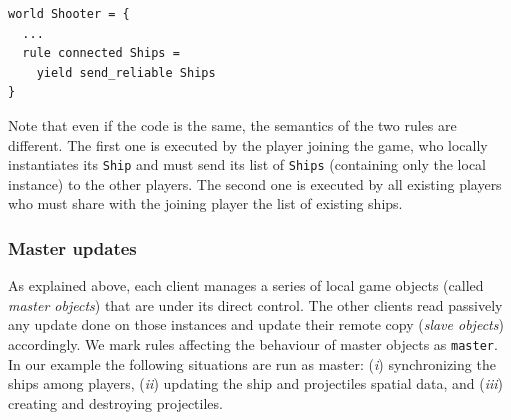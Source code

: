 \begin{lstlisting}
world Shooter = {
  ...
  rule connected Ships =
    yield send_reliable Ships
}
\end{lstlisting}

Note that even if the code is the same, the semantics of the two rules are different. The first one is executed by the player joining the game, who locally instantiates its \texttt{Ship} and must send its list of \texttt{Ships} (containing only the local instance) to the other players. The second one is executed by all existing players who must share with the joining player the list of existing ships.


\subsubsection{Master updates}
As explained above, each client manages a series of local game objects (called \textit{master objects}) that are under its direct control. The other clients read passively any update done on those instances and update their remote copy  (\textit{slave objects}) accordingly. We mark rules affecting the behaviour of master objects as \texttt{master}. In our example the following situations are run as master: (\textit{i}) synchronizing the ships among players, (\textit{ii}) updating the ship and projectiles spatial data, and (\textit{iii}) creating and destroying projectiles.

